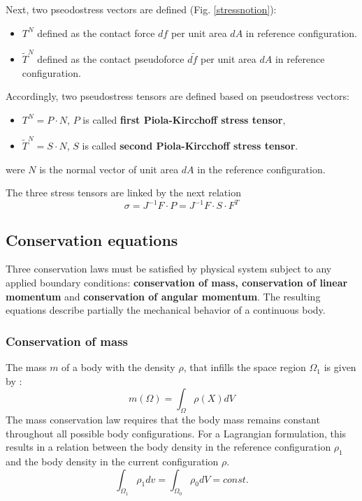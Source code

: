 Next, two pseodostress vectors are defined (Fig. \ref{stressnotion}):
\begin{itemize}
\item $T^N$ defined as the contact force $df$ per unit area $dA$ in reference configuration.
\item $\tilde{T}^N$ defined as the contact pseudoforce $d\tilde{f}$ per unit area $dA$ in reference configuration.  
\end{itemize}


Accordingly, two pseudostress tensors are defined based on pseudostress vectors:
\begin{itemize}
\item $T^N = P \cdot N$, $P$ is called \textbf{first Piola-Kircchoff stress tensor},
\item  $\tilde{T}^N = S \cdot N $, $S$ is called \textbf{second Piola-Kircchoff stress tensor}. 
\end{itemize} 
were $N$ is the normal vector of unit area $dA$ in the reference configuration.

The three stress tensors are linked by the next relation 
\begin{equation}
\sigma = J^{-1}F \cdot P = J^{-1} F \cdot S \cdot F^T
\label{PK12}
\end{equation}
\subsection{Conservation equations}\label{subsection:conservationequations}
Three conservation laws must be satisfied by physical system subject to any applied boundary conditions: \textbf{conservation of mass, conservation of linear momentum} and \textbf{conservation of angular momentum}. The resulting equations describe partially the mechanical behavior of a continuous body.

\subsubsection*{ Conservation of mass}
The mass $m$ of a body with the density $\rho$, that infills the space region $\Omega_1$ is given by :
\begin{equation}
m(\Omega) = \int_{\Omega} \rho(X)dV
\end{equation}
The mass conservation law requires that the body mass remains constant throughout all possible body configurations. For a Lagrangian formulation, this results in a relation between the body density in the reference configuration $\rho_1$ and the body density in the current configuration $\rho$.
$$\int_{\Omega_1} \rho_1 dv = \int_{\Omega_0} \rho_0 dV = const. $$


